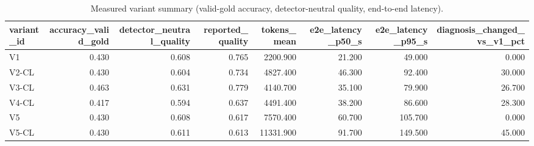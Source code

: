 \begin{table}[t]
\centering
\small
\begin{tabular}{lrrrrrrr}
\toprule
variant\_id & accuracy\_valid\_gold & detector\_neutral\_quality & reported\_quality & tokens\_mean & e2e\_latency\_p50\_s & e2e\_latency\_p95\_s & diagnosis\_changed\_vs\_v1\_pct \\
\midrule
V1 & 0.430 & 0.608 & 0.765 & 2200.900 & 21.200 & 49.000 & 0.000 \\
V2-CL & 0.430 & 0.604 & 0.734 & 4827.400 & 46.300 & 92.400 & 30.000 \\
V3-CL & 0.463 & 0.631 & 0.779 & 4140.700 & 35.100 & 79.900 & 26.700 \\
V4-CL & 0.417 & 0.594 & 0.637 & 4491.400 & 38.200 & 86.600 & 28.300 \\
V5 & 0.430 & 0.608 & 0.617 & 7570.400 & 60.700 & 105.700 & 0.000 \\
V5-CL & 0.430 & 0.611 & 0.613 & 11331.900 & 91.700 & 149.500 & 45.000 \\
\bottomrule
\end{tabular}
\caption{Measured variant summary (valid-gold accuracy, detector-neutral quality, end-to-end latency).}
\label{tab:rigor_variants}
\end{table}
